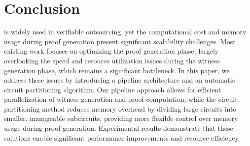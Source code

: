 \section{Conclusion}\label{sec:conclusion}
\zk is widely used in verifiable outsourcing, yet the computational cost and memory usage during proof generation present significant scalability challenges. Most existing work focuses on optimizing the proof generation phase, largely overlooking the speed and resource utilization issues during the witness generation phase, which remains a significant bottleneck. In this paper, we address these issues by introducing a pipeline architecture and an automatic circuit partitioning algorithm. Our pipeline approach allows for efficient parallelization of witness generation and proof computation, while the circuit partitioning method reduces memory overhead by dividing large circuits into smaller, manageable subcircuits, providing more flexible control over memory usage during proof generation. Experimental results demonstrate that these solutions enable significant performance improvements and resource efficiency.